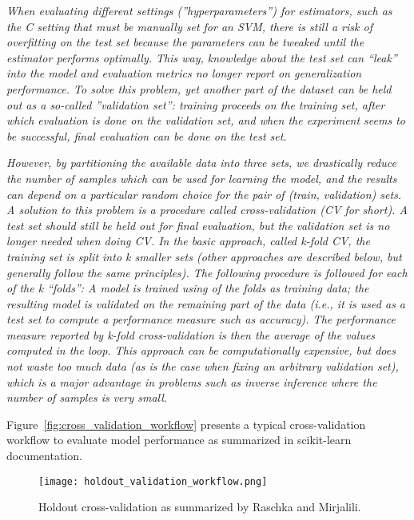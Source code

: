 \textit{When evaluating different settings (''hyperparameters'') for estimators, such as the C setting that must be manually set for an SVM, there is still a risk of overfitting on the test set because the parameters can be tweaked until the estimator performs optimally. This way, knowledge about the test set can “leak” into the model and evaluation metrics no longer report on generalization performance. To solve this problem, yet another part of the dataset can be held out as a so-called ''validation set'': training proceeds on the training set, after which evaluation is done on the validation set, and when the experiment seems to be successful, final evaluation can be done on the test set.}\cite{Scikit-learndevelopers2019a}

\textit{However, by partitioning the available data into three sets, we drastically reduce the number of samples which can be used for learning the model, and the results can depend on a particular random choice for the pair of (train, validation) sets.  A solution to this problem is a procedure called cross-validation (CV for short). A test set should still be held out for final evaluation, but the validation set is no longer needed when doing CV. In the basic approach, called k-fold CV, the training set is split into k smaller sets (other approaches are described below, but generally follow the same principles). The following procedure is followed for each of the k “folds”:  A model is trained using  of the folds as training data; the resulting model is validated on the remaining part of the data (i.e., it is used as a test set to compute a performance measure such as accuracy). The performance measure reported by k-fold cross-validation is then the average of the values computed in the loop. This approach can be computationally expensive, but does not waste too much data (as is the case when fixing an arbitrary validation set), which is a major advantage in problems such as inverse inference where the number of samples is very small.}\cite{Scikit-learndevelopers2019a}

Figure~\ref{fig:cross_validation_workflow} presents a typical cross-validation workflow to evaluate model performance as summarized in scikit-learn documentation\cite{Scikit-learndevelopers2019a}.

\begin{figure}[hbt!]
    \centering
    \texttt{[image: holdout\_validation\_workflow.png]}
    \caption{Holdout cross-validation as summarized by Raschka and Mirjalili\cite{RaschkaMirjalili2017}.}
    \label{fig:holdout_validation_workflow}
\end{figure}

